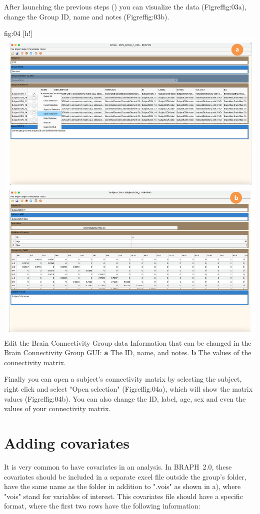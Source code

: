 \documentclass[justified]{tufte-handout}
\begin{document}
After launching the previous steps () you can visualize the data (Figref{fig:03}a), change the Group ID, name and notes (Figref{fig:03}b). 

	{fig:04}
	{
	[h!]
	\includegraphics{tut_gr_conn/fig04.png}
	}
	{Edit the Brain Connectivity Group data}
	{
	Information that can be changed in the Brain Connectivity Group GUI: 
	{\bf a} The ID, name, and notes.
	{\bf b} The values of the connectivity matrix.
	}

Finally you can open a subject's connectivity matrix by selecting the subject, right click and select "Open selection" (Figref{fig:04}a), which will show the matrix values (Figref{fig:04}b). You can also change the ID, label, age, sex and even the values of your connectivity matrix.
	

\section{Adding covariates}

It is very common to have covariates in an analysis. In BRAPH~2.0, these covariates should be included in a separate excel file outside the group's folder, have the same name as the folder in addition to ".vois" as shown in a), where "vois" stand for variables of interest. This covariates file should have a specific format, where the first two rows have the following information:
\end{document}
